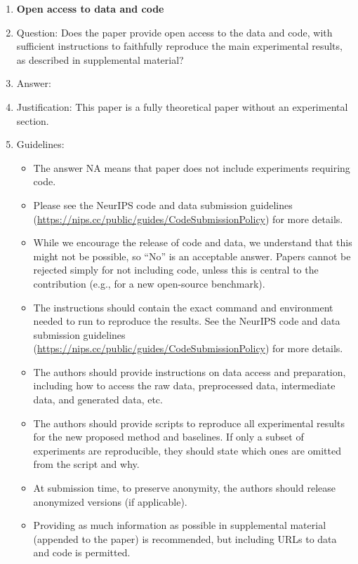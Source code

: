 \documentclass{article}
\theoremstyle{plain}
\theoremstyle{definition}
\theoremstyle{remark}
\begin{document}
\begin{enumerate}
\item {\bf Open access to data and code}
    \item[] Question: Does the paper provide open access to the data and code, with sufficient instructions to faithfully reproduce the main experimental results, as described in supplemental material?
    \item[] Answer: \answerNA{} %
    \item[] Justification: This paper is a fully theoretical paper without an experimental section.
    \item[] Guidelines:
    \begin{itemize}
        \item The answer NA means that paper does not include experiments requiring code.
        \item Please see the NeurIPS code and data submission guidelines (\url{https://nips.cc/public/guides/CodeSubmissionPolicy}) for more details.
        \item While we encourage the release of code and data, we understand that this might not be possible, so “No” is an acceptable answer. Papers cannot be rejected simply for not including code, unless this is central to the contribution (e.g., for a new open-source benchmark).
        \item The instructions should contain the exact command and environment needed to run to reproduce the results. See the NeurIPS code and data submission guidelines (\url{https://nips.cc/public/guides/CodeSubmissionPolicy}) for more details.
        \item The authors should provide instructions on data access and preparation, including how to access the raw data, preprocessed data, intermediate data, and generated data, etc.
        \item The authors should provide scripts to reproduce all experimental results for the new proposed method and baselines. If only a subset of experiments are reproducible, they should state which ones are omitted from the script and why.
        \item At submission time, to preserve anonymity, the authors should release anonymized versions (if applicable).
        \item Providing as much information as possible in supplemental material (appended to the paper) is recommended, but including URLs to data and code is permitted.
    \end{itemize}



\end{enumerate}
\end{document}
